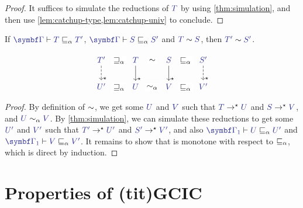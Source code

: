 \begin{proof}
  It suffices to simulate the reductions of $\tcol{T}$ by using \cref{thm:simulation}, and then use \cref{lem:catchup-type,lem:catchup-univ} to conclude.
\end{proof}

\begin{corollary}
	\label{cor:mon-cons}
	If $\tcol{\GG} \vdash \tcol{T} \capre \tcol{T'}$, $\tcol{\GG} \vdash \tcol{S} \capre \tcol{S'}$ and $\tcol{T} \cons \tcol{S}$, then $\tcol{T'} \cons \tcol{S'}$.
\end{corollary}

\begin{marginfigure}
  \[\begin{tikzcd}
    \tcol{T'}
      \arrow[d, dashed, "\star" very near end]
      \arrow[r, phantom, "\caprerev" description]
    & \tcol{T}
      \arrow[d, "\star" very near end]
      \arrow[r, phantom, "\cons" description]
    & \tcol{S}
      \arrow[d, "\star" very near end]
      \arrow[r, phantom, "\capre" description]
    & \tcol{S'}
      \arrow[d, dashed, "\star" very near end] \\
    \tcol{U'}
      \arrow[r, phantom, "\caprerev" description]
    & \tcol{U}
      \arrow[r, phantom, "\acons" description]
    & \tcol{V}
      \arrow[r, phantom, "\capre" description]
    & \tcol{V'}
  \end{tikzcd}\]
  \caption{The proof of \cref{cor:mon-cons}, as a diagram}
\end{marginfigure}

\begin{proof}
	By definition of $\sim$,
  we get some $\tcol{U}$ and $\tcol{V}$ such that $\tcol{T} \red \tcol{U}$ and
  $\tcol{S} \red \tcol{V}$, and $\tcol{U} \acons \tcol{V}$.
  By \cref{thm:simulation}, we can simulate these reductions to get some
  $\tcol{U'}$ and $\tcol{V'}$ such that $\tcol{T'} \red \tcol{U'}$ and
  $\tcol{S'} \red \tcol{V'}$,
  and also $\tcol{\fs{\GG}} \vdash \tcol{U} \capre \tcol{U'}$
  and $\tcol{\fs{\GG}} \vdash \tcol{V} \capre \tcol{V'}$.
  It remains to show that  is monotone with respect to
   $\sqsubseteq_{\alpha}$, which is direct by induction.
\end{proof}

\section{Properties of \kl(tit){GCIC}}
\label{sec:gcic-theorems}

